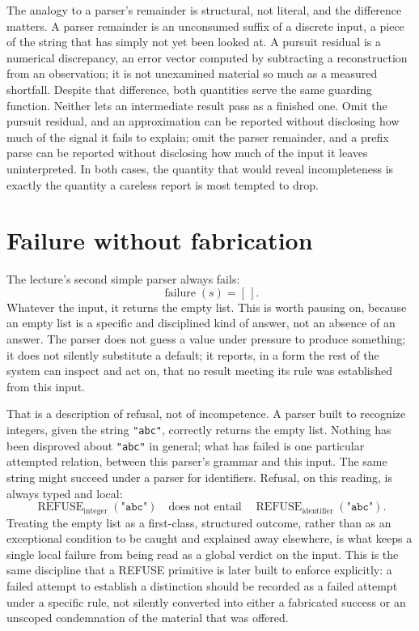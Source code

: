 \documentclass[11pt]{article}
\begin{document}
The analogy to a parser's remainder is structural, not literal, and the difference matters. A parser remainder is an unconsumed suffix of a discrete input, a piece of the string that has simply not yet been looked at. A pursuit residual is a numerical discrepancy, an error vector computed by subtracting a reconstruction from an observation; it is not unexamined material so much as a measured shortfall. Despite that difference, both quantities serve the same guarding function. Neither lets an intermediate result pass as a finished one. Omit the pursuit residual, and an approximation can be reported without disclosing how much of the signal it fails to explain; omit the parser remainder, and a prefix parse can be reported without disclosing how much of the input it leaves uninterpreted. In both cases, the quantity that would reveal incompleteness is exactly the quantity a careless report is most tempted to drop.

\section{Failure without fabrication}

The lecture's second simple parser always fails:
\[
\operatorname{failure}(s) = [\,].
\]
Whatever the input, it returns the empty list. This is worth pausing on, because an empty list is a specific and disciplined kind of answer, not an absence of an answer. The parser does not guess a value under pressure to produce something; it does not silently substitute a default; it reports, in a form the rest of the system can inspect and act on, that no result meeting its rule was established from this input.

That is a description of refusal, not of incompetence. A parser built to recognize integers, given the string \texttt{"abc"}, correctly returns the empty list. Nothing has been disproved about \texttt{"abc"} in general; what has failed is one particular attempted relation, between this parser's grammar and this input. The same string might succeed under a parser for identifiers. Refusal, on this reading, is always typed and local:
\[
\operatorname{REFUSE}_{\text{integer}}(\texttt{"abc"}) \quad\text{does not entail}\quad \operatorname{REFUSE}_{\text{identifier}}(\texttt{"abc"}).
\]
Treating the empty list as a first-class, structured outcome, rather than as an exceptional condition to be caught and explained away elsewhere, is what keeps a single local failure from being read as a global verdict on the input. This is the same discipline that a REFUSE primitive is later built to enforce explicitly: a failed attempt to establish a distinction should be recorded as a failed attempt under a specific rule, not silently converted into either a fabricated success or an unscoped condemnation of the material that was offered.
\end{document}
